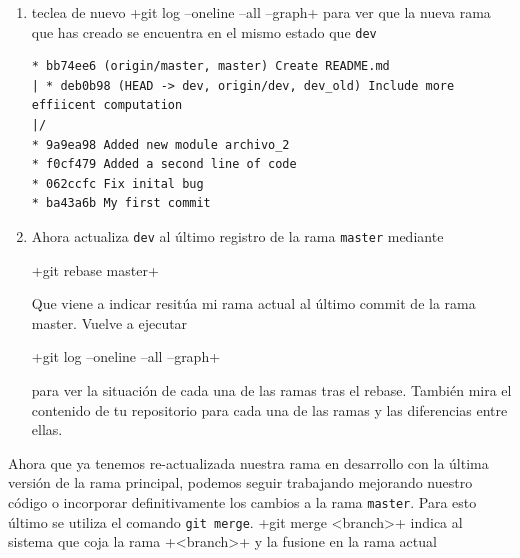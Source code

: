 \documentclass[a5paper, oneside,10pt]{article}
\begin{document}
\begin{enumerate}
    \item teclea de nuevo 
    \cverb+git log --oneline --all --graph+
    para ver que la nueva rama que has creado se encuentra en el mismo estado que \verb+dev+
    
    \begin{lstlisting}[style=custom]
* bb74ee6 (origin/master, master) Create README.md
| * deb0b98 (HEAD -> dev, origin/dev, dev_old) Include more effiicent computation
|/  
* 9a9ea98 Added new module archivo_2
* f0cf479 Added a second line of code
* 062ccfc Fix inital bug
* ba43a6b My first commit
    \end{lstlisting}
    
    \item Ahora actualiza \verb+dev+ al último registro de la rama \verb+master+ mediante
    
    \cverb+git rebase master+
    
    Que viene a indicar resitúa mi rama actual al último commit de la rama master. Vuelve a ejecutar 
    
    \cverb+git log --oneline --all --graph+ 
    
    para ver la situación de cada una de las ramas tras el rebase. También mira el contenido de tu repositorio para cada una de las ramas y las diferencias entre ellas.
   
    \end{enumerate}
    
    Ahora que ya tenemos re-actualizada nuestra rama en desarrollo con la última versión de la rama principal, podemos seguir trabajando mejorando nuestro código o incorporar definitivamente los cambios a la rama \verb+master+. Para esto último se utiliza el comando \verb+git merge+. \cverb+git merge <branch>+  indica al sistema que coja la rama \cverb+<branch>+ y la fusione en la rama actual
    
\end{document}
